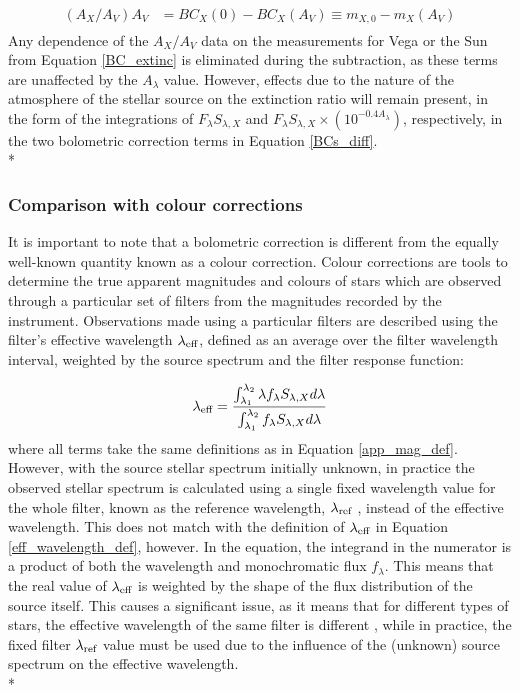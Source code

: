\documentclass[12pt, a4paper]{report}
\begin{document}
\begin{align}
\begin{split}
\left(A_{X}/A_{V}\right)A_{V} &= BC_{X}(0) - BC_{X}(A_{V}) \equiv m_{X,0} - m_{X}(A_{V})
\label{BCs_diff}
\end{split}
\end{align}
Any dependence of the $A_{X}/A_{V}$ data on the measurements for Vega or the Sun from Equation \ref{BC_extinc} is eliminated during the subtraction, as these terms are unaffected by the $A_{\lambda}$ value. However, effects due to the nature of the atmosphere of the stellar source on the extinction ratio will remain present, in the form of the integrations of $F_{\lambda}S_{\lambda,X}$ and $F_{\lambda}S_{\lambda,X} \times \left( 10^{-0.4 A_{\lambda}} \right)$, respectively, in the two bolometric correction terms in Equation \ref{BCs_diff}. \\*

\subsubsection{Comparison with colour corrections} \label{color_corr}
It is important to note that a bolometric correction is different from the equally well-known quantity known as a colour correction. Colour corrections are tools to determine the true apparent magnitudes and colours of stars which are observed through a particular set of filters from the magnitudes recorded by the instrument. Observations made using a particular filters are described using the filter's effective wavelength $\lambda_{\textnormal{eff}}$, defined as an average over the filter wavelength interval, weighted by the source spectrum and the filter response function:

\begin{equation}
\lambda_{\textnormal{eff}} = \frac{ \int_{\lambda_{1}}^{\lambda_{2}} \lambda f_{\lambda} S_{\lambda,X} d\lambda }{ \int_{\lambda_{1}}^{\lambda_{2}} f_{\lambda} S_{\lambda,X} d\lambda }
\label{eff_wavelength_def}
\end{equation}
where all terms take the same definitions as in Equation \ref{app_mag_def}. However, with the source stellar spectrum initially unknown, in practice the observed stellar spectrum is calculated using a single fixed wavelength value for the whole filter, known as the reference wavelength, $\lambda_{\textnormal{ref}}$ \citep{2006A&A...447..769P}, instead of the effective wavelength. This does not match with the definition of $\lambda_{\textnormal{eff}}$ in Equation \ref{eff_wavelength_def}, however. In the equation, the integrand in the numerator is a product of both the wavelength and monochromatic flux $f_{\lambda}$. This means that the real value of $\lambda_{\textnormal{eff}}$ is weighted by the shape of the flux distribution of the source itself. This causes a significant issue, as it means that for different types of stars, the effective wavelength of the same filter is different \citep{1988iras....1.....B}, while in practice, the fixed filter $\lambda_{\textnormal{ref}}$ value must be used due to the influence of the (unknown) source spectrum on the effective wavelength.\\*
\end{document}
